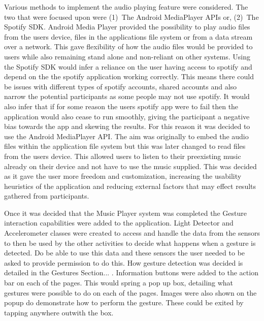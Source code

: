 \documentclass{l4proj}
\begin{document}
Various methods to implement the audio playing feature were considered. The two that were focused upon were (1)~The Android MediaPlayer APIs or, (2)~The Spotify SDK. Android Media Player provided the possibility to play audio files from the users device, files in the applications file system or from a data stream over a network. This gave flexibility of how the audio files would be provided to users while also remaining stand alone and non-reliant on other systems. Using the Spotify SDK would infer a reliance on the user having access to spotify and depend on the the spotify application working correctly. This means there could be issues with different types of spotify accounts, shared accounts and also narrow the potential participants as some people may not use spotify. It would also infer that if for some reason the users spotify app were to fail then the application would also cease to run smoothly, giving the participant a negative bias towards the app and skewing the results. For this reason it was decided to use the Android MediaPlayer API. The aim was originally to embed the audio files within the application file system but this was later changed to read files from the users device. This allowed users to listen to their preexisting music already on their device and not have to use the music supplied. This was decided as it gave the user more freedom and customization, increasing the usability heuristics of the application and reducing external factors that may effect results gathered from participants.

Once it was decided that the Music Player system was completed the Gesture interaction capabilities were added to the application. Light Detector and Accelerometer classes were created to access and handle the data from the sensors to then be used by the other activities to decide what happens when a gesture is detected. Do be able to use this data and these sensors the user needed to be asked to provide permission to do this. How gesture detection was decided is detailed in the Gestures Section... . Information buttons were added to the action bar on each of the pages. This would spring a pop up box, detailing what gestures were possible to do on each of the pages. Images were also shown on the popup do demonstrate how to perform the gesture. These could be exited by tapping anywhere outwith the box.
\end{document}
